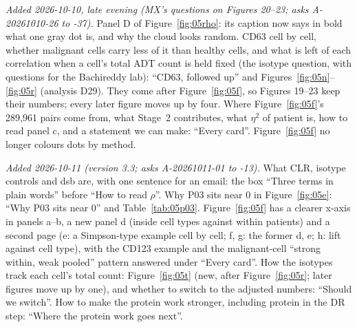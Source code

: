 {\emph{Added 2026-10-10, late evening (MX's questions on Figures 20--23; asks A-20261010-26 to -37).} Panel D of Figure~\ref{fig:05rho}: its caption now says in bold what one gray dot is, and why the cloud looks random. CD63 cell by cell, whether malignant cells carry less of it than healthy cells, and what is left of each correlation when a cell's total ADT count is held fixed (the isotype question, with questions for the Bachireddy lab): ``CD63, followed up'' and Figures~\ref{fig:05n}--\ref{fig:05r} (analysis D29). They come after Figure~\ref{fig:05f}, so Figures 19--23 keep their numbers; every later figure moves up by four. Where Figure~\ref{fig:05f}'s 289,961 pairs come from, what Stage~2 contributes, what $\eta^2$ of patient is, how to read panel c, and a statement we can make: ``Every card''. Figure~\ref{fig:05f} no longer colours dots by method.\par
\emph{Added 2026-10-11 (version 3.3; asks A-20261011-01 to -13).} What CLR, isotype controls and dsb are, with one sentence for an email: the box ``Three terms in plain words'' before ``How to read $\rho$''. Why P03 sits near 0 in Figure~\ref{fig:05e}: ``Why P03 sits near 0'' and Table~\ref{tab:05p03}. Figure~\ref{fig:05f} has a clearer x-axis in panels a--b, a new panel d (inside cell types against within patients) and a second page (e: a Simpson-type example cell by cell; f, g: the former d, e; h: lift against cell type), with the CD123 example and the malignant-cell ``strong within, weak pooled'' pattern answered under ``Every card''. How the isotypes track each cell's total count: Figure~\ref{fig:05t} (new, after Figure~\ref{fig:05r}; later figures move up by one), and whether to switch to the adjusted numbers: ``Should we switch''. How to make the protein work stronger, including protein in the DR step: ``Where the protein work goes next''.\par}

